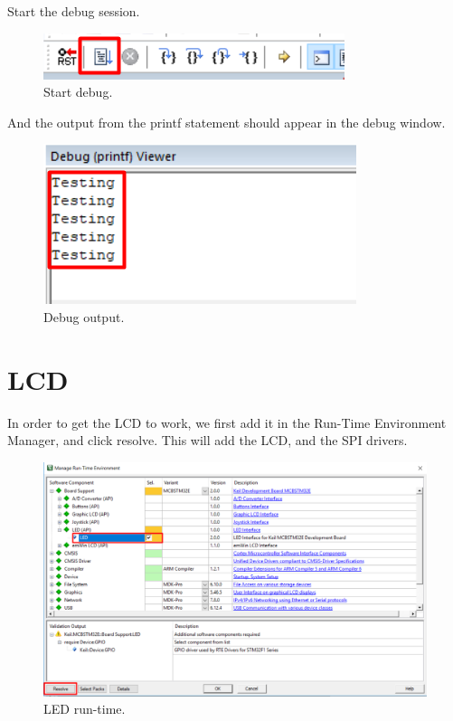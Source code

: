 \documentclass{article}
\begin{document}
Start the debug session.
\begin{figure}[H]
    \centering
    \includegraphics[width=0.5\linewidth]{pics/RunDebugSession.png}
    \caption{Start debug.}
    \label{fig:StartDebugger}
\end{figure}

\newpage

And the output from the printf statement should appear in the debug window.
\begin{figure}[H]
    \centering
    \includegraphics[width=0.5\linewidth]{pics/DebugOutput.png}
    \caption{Debug output.}
    \label{fig:DebugOutput}
\end{figure}

\newpage

\section{LCD}
In order to get the LCD to work, we first add it in the Run-Time Environment Manager,
and click resolve. This will add the LCD, and the SPI drivers.
\begin{figure}[H]
    \centering
    \includegraphics[width=0.8\linewidth]{pics/LEDRuntime.png}
    \caption{LED run-time.}
    \label{fig:LEDRuntime}
\end{figure}
\end{document}
